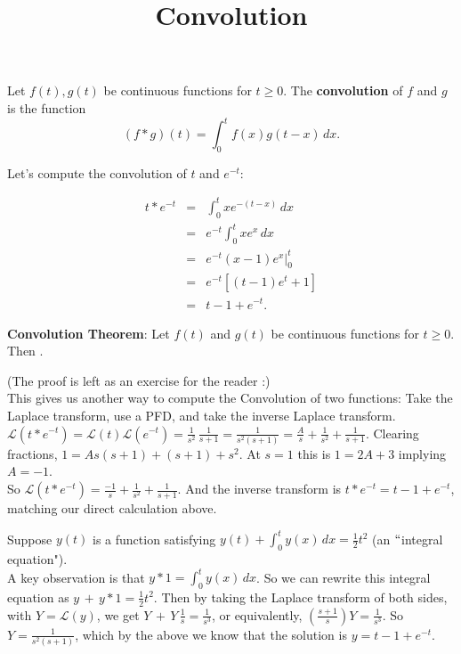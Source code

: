 \documentclass{ximera}
\begin{document}
\begin{abstract}
 \end{abstract}

    \title{Convolution}
    \maketitle

 Let $f(t),g(t)$ be continuous functions for $t\geq 0$.  The \textbf{convolution} of $f$ and $g$ is the function $$\displaystyle (f\ast g)(t)=\int_{0}^{t}f(x)g(t-x)\,dx.$$

 Let's compute the convolution of $t$ and $e^{-t}$:


 \begin{eqnarray*}
  t\ast e^{-t} &=& \displaystyle \int_{0}^{t}xe^{-(t-x)}\,dx \\
   &=& \displaystyle e^{-t}\int_{0}^{t}xe^{x}\,dx \\
  &=& \displaystyle e^{-t}\left.(x-1)e^{x}\right|_{0}^{t} \\
   &=& \displaystyle e^{-t}\left[(t-1)e^{t}+1\right] \\
   &=& \displaystyle t-1+e^{-t}.
 \end{eqnarray*}

 \textbf{Convolution Theorem}: Let $f(t)$ and $g(t)$ be continuous functions for $t\geq 0$.  Then .

 (The proof is left as an exercise for the reader :)\\

 This gives us another way to compute the Convolution of two functions:  Take the Laplace transform, use a PFD, and take the inverse Laplace transform.\\

 $\displaystyle \mathcal{L}(t\ast e^{-t})=\mathcal{L}(t) \mathcal{L}(e^{-t})=\frac{1}{s^2} \, \frac{1}{s+1}=\frac{1}{s^2(s+1)}=\frac{A}{s}+\frac{1}{s^2}+\frac{1}{s+1}$.  Clearing fractions, $1=As(s+1)+(s+1)+s^2$.  At $s=1$ this is $1=2A+3$ implying $A=-1$.\\

  So $\displaystyle \mathcal{L}(t\ast e^{-t})=\frac{-1}{s}+\frac{1}{s^2}+\frac{1}{s+1}$.   And the inverse transform is $t\ast e^{-t}=t-1+e^{-t}$, matching our direct calculation above.

  \newpage
  

 Suppose $y(t)$ is a function satisfying $\displaystyle y(t)+\int_0^t y(x)\,dx=\frac{1}{2}t^2$ (an $``$integral equation").\\

 A key observation is that $\displaystyle y\ast 1=\int_0^t y(x)\,dx$.  So we can rewrite this integral equation as $y\,+\,y\ast 1=\frac{1}{2}t^2$.  Then by taking the Laplace transform of both sides, with $Y=\mathcal{L}(y)$, we get $Y\,+\, Y\,\frac{1}{s}=\frac{1}{s^3}$, or equivalently, $\displaystyle \left(\frac{s+1}{s}\right) Y=\frac{1}{s^3}$.  So $\displaystyle Y=\frac{1}{s^2(s+1)}$,  which by the above we know that the solution is $y=t-1+e^{-t}$.
\end{document}
